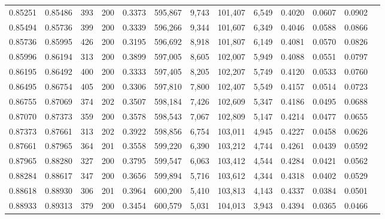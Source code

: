 \begin{tabular}{rrrrrrrrrrrrr}
0.85251 & 0.85486 &   393 & 200 &                                     0.3373 & 595,867 &   9,743 & 101,407 &   6,549 & 0.4020 & 0.0607 & 0.0902 \\
0.85494 & 0.85736 &   399 & 200 &                                     0.3339 & 596,266 &   9,344 & 101,607 &   6,349 & 0.4046 & 0.0588 & 0.0866 \\
0.85736 & 0.85995 &   426 & 200 &                                     0.3195 & 596,692 &   8,918 & 101,807 &   6,149 & 0.4081 & 0.0570 & 0.0826 \\
0.85996 & 0.86194 &   313 & 200 &                                     0.3899 & 597,005 &   8,605 & 102,007 &   5,949 & 0.4088 & 0.0551 & 0.0797 \\
0.86195 & 0.86492 &   400 & 200 &                                     0.3333 & 597,405 &   8,205 & 102,207 &   5,749 & 0.4120 & 0.0533 & 0.0760 \\
0.86495 & 0.86754 &   405 & 200 &                                     0.3306 & 597,810 &   7,800 & 102,407 &   5,549 & 0.4157 & 0.0514 & 0.0723 \\
0.86755 & 0.87069 &   374 & 202 &                                     0.3507 & 598,184 &   7,426 & 102,609 &   5,347 & 0.4186 & 0.0495 & 0.0688 \\
0.87070 & 0.87373 &   359 & 200 &                                     0.3578 & 598,543 &   7,067 & 102,809 &   5,147 & 0.4214 & 0.0477 & 0.0655 \\
0.87373 & 0.87661 &   313 & 202 &                                     0.3922 & 598,856 &   6,754 & 103,011 &   4,945 & 0.4227 & 0.0458 & 0.0626 \\
0.87661 & 0.87965 &   364 & 201 &                                     0.3558 & 599,220 &   6,390 & 103,212 &   4,744 & 0.4261 & 0.0439 & 0.0592 \\
0.87965 & 0.88280 &   327 & 200 &                                     0.3795 & 599,547 &   6,063 & 103,412 &   4,544 & 0.4284 & 0.0421 & 0.0562 \\
0.88284 & 0.88617 &   347 & 200 &                                     0.3656 & 599,894 &   5,716 & 103,612 &   4,344 & 0.4318 & 0.0402 & 0.0529 \\
0.88618 & 0.88930 &   306 & 201 &                                     0.3964 & 600,200 &   5,410 & 103,813 &   4,143 & 0.4337 & 0.0384 & 0.0501 \\
0.88933 & 0.89313 &   379 & 200 &                                     0.3454 & 600,579 &   5,031 & 104,013 &   3,943 & 0.4394 & 0.0365 & 0.0466 \\

\end{tabular}
